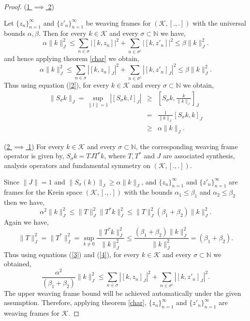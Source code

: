 \documentclass[article,12pt]{amsart}
\begin{document}
\begin{proof}  \noindent  (\underline{1 $\implies$ 2})
	
Let $\{z_n\}_{n=1}^\infty$ and $\{z'_n\}_{n=1}^\infty$ be weaving frames for $(\mathcal K, [.,.])$ with the universal bounds $\alpha, \beta$. Then for every $k \in \mathcal K$ and every $\sigma \subset \mathbb N$ we have,
\begin{equation*}
\alpha \|k\|_{J}^2 \leq \sum\limits_{n \in \sigma} |[k, z_n]|^2 + \sum\limits_{n \in \sigma^c} |[k, z'_n]|^2 \leq \beta \|k\|_{J}^2.
\end{equation*}
and hence applying theorem \ref{char} we obtain,
\begin{equation}\label{2}
\alpha \|k\|_{J}^2 \leq \sum\limits_{n \in \sigma} |[k, z_n]_{J}|^2 + \sum\limits_{n \in \sigma^c} |[k, z'_n]_{J}|^2 \leq \beta \|k\|_{J}^2.
\end{equation}
Thus using equation (\ref{2}), for every $k \in \mathcal K$ and every $\sigma \subset \mathbb N$ we obtain,
\begin{eqnarray*}
\|S_{\sigma}k\|_{J} = \sup\limits_{\|l\|=1} |[S_{\sigma}k, l]_{J}| & \geq & \left [ S_{\sigma}k, \frac{k}{\|k\|_{J}}\right ]_{J}\\
& = & \frac{1} {\|k\|_{J}} [S_{\sigma}k, k]_{J}\\
& \geq & \alpha \|k\|_{J}.
\end{eqnarray*}

 \noindent  (\underline{2 $\implies$ 1}) For every $k \in \mathcal K$ and every $\sigma \subset \mathbb N$, the corresponding weaving frame operator is given by, $S_{\sigma} k = TJT^* k$, where $T, T^*$ and $J$ are associated synthesis, analysis operators and fundamental symmetry on $(\mathcal K, [.,.])$. 
 
 Since $\|J\| = 1$ and $\|S_{\sigma}(k)\|_{J} \geq \alpha \|k\|_{J}$, and $\{z_n\}_{n=1}^\infty$ and $\{z'_n\}_{n=1}^\infty$ are frames for the Krein space $(\mathcal K, [.,.])$ with the bounds $\alpha_1 \leq \beta_1$ and $\alpha_2 \leq \beta_2$ then we have,
 \begin{equation}\label{3}
 \alpha^2 \|k\|_{J}^2 \leq \|T\|_{J}^2 \|T^*k\|_{J}^2 \leq \|T\|_{J}^2 (\beta_1 + \beta_2) \|k\|_{J}^2.
\end{equation}  
Again we have,
\begin{equation}\label{4}
\|T\|_{J}^2 = \|T^*\|_{J}^2 = \sup\limits_{k \neq 0} \frac{\|T^*k\|_{J}^2} {\|k\|_{J}^2} \leq \frac { (\beta_1 + \beta_2) \|k\|_{J}^2}{\|k\|_{J}^2} = (\beta_1 + \beta_2).
\end{equation}
Thus using equations (\ref{3}) and (\ref{4}), for every $k \in \mathcal K$ and every $\sigma \subset \mathbb N$ we obtained,
\begin{equation}
\frac{\alpha^2}{(\beta_1 + \beta_2)} \|k\|_{J}^2 \leq \sum\limits_{n \in \sigma} |[k, z_n]_{J}|^2 + \sum\limits_{n \in \sigma^c} |[k, z'_n]_{J}|^2 .
\end{equation}
The upper weaving frame bound will be achieved automatically under the given assumption. Therefore, applying theorem \ref{char}, $\{z_n\}_{n=1}^\infty$ and $\{z'_n\}_{n=1}^\infty$ are weaving frames for $\mathcal K$.
\end{proof}
\end{document}
